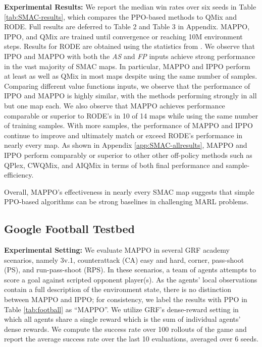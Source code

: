 \documentclass{article}
\theoremstyle{plain}
\theoremstyle{definition}
\theoremstyle{remark}
\begin{document}
\textbf{Experimental Results:} We report the median win rates over six seeds in Table \ref{tab:SMAC-results}, which compares the PPO-based methods to QMix and RODE. Full results are deferred to Table 2 and Table 3 in Appendix. MAPPO, IPPO, and QMix are trained until convergence or reaching 10M environment steps. Results for RODE are obtained using the statistics from \cite{wang2021rode}. We observe that IPPO and MAPPO with both the \emph{AS} and \emph{FP} inputs achieve strong performance in the vast majority of SMAC maps. In particular, MAPPO and IPPO perform at least as well as QMix in most maps despite using the same number of samples. Comparing different value functions inputs, we observe that the performance of IPPO and MAPPO is highly similar, with the methods performing strongly in all but one map each. We also observe that MAPPO achieves performance comparable or superior to RODE's in 10 of 14 maps while using the same number of training samples. With more samples, the performance of MAPPO and IPPO continue to improve and ultimately match or exceed RODE's performance in nearly every map. As shown in Appendix \ref{app:SMAC-allresults}, 
MAPPO and IPPO perform comparably or superior to other other off-policy methods such as QPlex, CWQMix, and AIQMix in terms of both final performance and sample-efficiency.

Overall, MAPPO's effectiveness in nearly every SMAC map suggests that simple PPO-based algorithms can be strong baselines in challenging MARL problems. 


\subsection{Google Football Testbed}
\textbf{Experimental Setting:} We evaluate MAPPO in several GRF academy scenarios, namely 3v.1, counterattack (CA) easy and hard, corner, pass-shoot (PS), and run-pass-shoot (RPS). In these scenarios, a team of agents attempts to score a goal against scripted opponent player(s). As the agents' local observations contain a full description of the environment state, there is no distinction between MAPPO and IPPO; for consistency, we label the results with PPO in Table \ref{tab:football} as ``MAPPO''.  We utilize GRF's dense-reward setting in which all agents share a single reward which is the sum of individual agents' dense rewards. We compute the success rate over 100 rollouts of the game and report the average success rate over the last 10 evaluations, averaged over 6 seeds.
\end{document}

